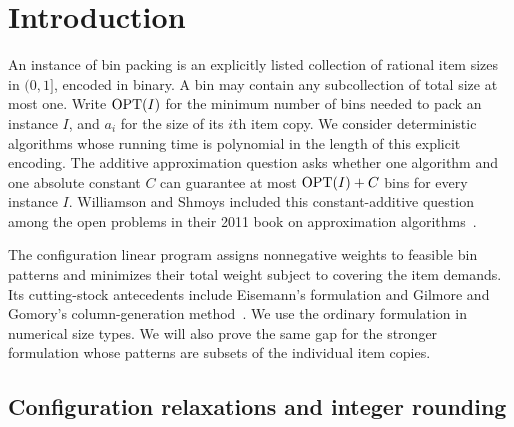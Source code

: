 \section{Introduction}\label{sec:introduction}

An instance of bin packing is an explicitly listed collection of rational
item sizes in $(0,1]$, encoded in binary. A bin may contain any
subcollection of total size at most one. Write $\operatorname{OPT}(I)$ for the minimum
number of bins needed to pack an instance $I$, and $a_i$ for the size of
its $i$th item copy. We consider deterministic
algorithms whose running time is polynomial in the length of this explicit
encoding. The additive approximation question asks whether one algorithm
and one absolute constant $C$ can guarantee at most $\operatorname{OPT}(I)+C$ bins for
every instance $I$.
Williamson and Shmoys included this constant-additive question among
the open problems in their 2011 book on approximation
algorithms~\cite[Chapter~17, Problem~3]{WilliamsonShmoys2011}.

The configuration linear program assigns nonnegative weights
to feasible bin patterns and minimizes their total weight subject to
covering the item demands. Its cutting-stock antecedents include
Eisemann's formulation and Gilmore and Gomory's column-generation
method~\cite[p.~849]{GilmoreGomory1961}.
We use the ordinary formulation in numerical
size types. We will also prove the same gap for the stronger formulation
whose patterns are subsets of the individual item copies.

\subsection{Configuration relaxations and integer rounding}


